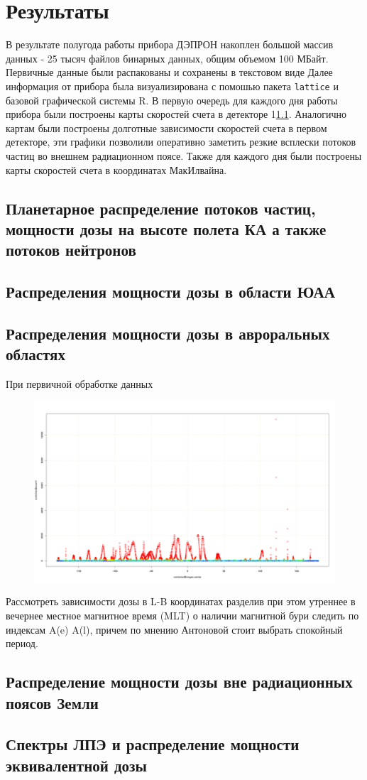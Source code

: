 
\chapter{Результаты}\label{chapt_results}
В результате полугода работы прибора ДЭПРОН накоплен большой массив данных - 25 тысяч файлов бинарных данных, общим объемом 100 МБайт. Первичные данные были распакованы и сохранены в текстовом виде 
Далее информация от прибора была визуализирована с помошью пакета \texttt{lattice} и базовой графической системы R. 
В первую очередь для каждого дня работы прибора были построены карты скоростей счета в детекторе 1\ref{sec:planetDose}. Аналогично картам были построены долготные зависимости скоростей счета в первом детекторе, эти графики позволили оперативно заметить резкие всплески потоков частиц во внешнем радиационном поясе. Также для каждого дня были построены карты скоростей счета в координатах МакИлвайна.

\section{Планетарное распределение потоков частиц, мощности дозы на высоте полета КА а также потоков нейтронов} \label{sec:planetDose}


\section{Распределения мощности дозы в области ЮАА}

\section{Распределения мощности дозы в авроральных областях}
При первичной обработке данных 
\begin{figure}
	\includegraphics[width=0.8\linewidth]{images/Flash/depron_lat_map_148}
	\caption[Потокизаряженных частиц в детекторе 1]{}
	\caption{}
	\label{fig:depronlatmap148}
\end{figure}
Рассмотреть зависимости дозы в L-B координатах разделив при этом утреннее в вечернее местное магнитное время (MLT) о наличии магнитной бури следить по индексам A(e) A(l), причем по мнению Антоновой стоит выбрать спокойный период.



\section{Распределение мощности дозы вне радиационных поясов Земли}

\section{Спектры ЛПЭ и распределение мощности эквивалентной дозы}